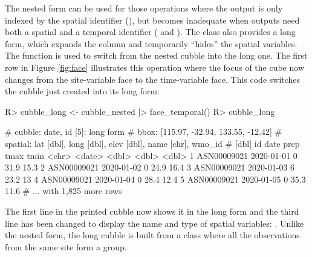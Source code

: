 \documentclass[
]{jss}
\begin{document}
The nested form can be used for those operations where the output is only indexed by the spatial identifier (), but becomes inadequate when outputs need both a spatial and a temporal identifier ( and ). The  class also provides a long form, which expands the  column and temporarily ``hides'' the spatial variables. The function  is used to switch from the nested cubble into the long one. The first row in Figure \ref{fig:face} illustrates this operation where the focus of the cube now changes from the site-variable face to the time-variable face. This code switches the cubble just created into its long form:

\begin{CodeChunk}
\begin{CodeInput}
R> cubble_long <- cubble_nested |> face_temporal()
R> cubble_long
\end{CodeInput}
\begin{CodeOutput}
# cubble:  date, id [5]: long form
# bbox:    [115.97, -32.94, 133.55, -12.42]
# spatial: lat [dbl], long [dbl], elev [dbl], name [chr], wmo_id
#   [dbl]
  id          date        prcp  tmax  tmin
  <chr>       <date>     <dbl> <dbl> <dbl>
1 ASN00009021 2020-01-01     0  31.9  15.3
2 ASN00009021 2020-01-02     0  24.9  16.4
3 ASN00009021 2020-01-03     6  23.2  13  
4 ASN00009021 2020-01-04     0  28.4  12.4
5 ASN00009021 2020-01-05     0  35.3  11.6
# ... with 1,825 more rows
\end{CodeOutput}
\end{CodeChunk}

The first line in the printed cubble now shows it in the long form and the third line has been changed to display the name and type of spatial variables: . Unlike the nested form, the long cubble is built from a  class where all the observations from the same site form a group.
\end{document}
